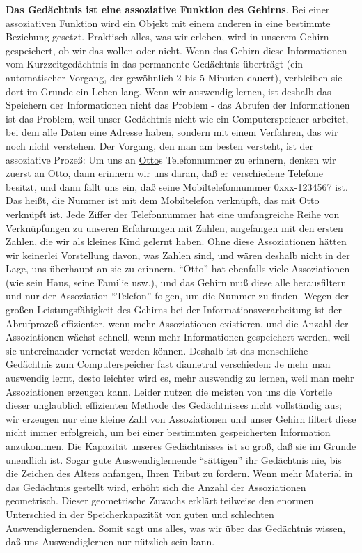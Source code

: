 \textbf{Das Gedächtnis ist eine assoziative Funktion des Gehirns}.
Bei einer assoziativen Funktion wird ein Objekt mit einem anderen in eine bestimmte Beziehung gesetzt.
Praktisch alles, was wir erleben, wird in unserem Gehirn gespeichert, ob wir das wollen oder nicht.
Wenn das Gehirn diese Informationen vom Kurzzeitgedächtnis in das permanente Gedächtnis überträgt (ein automatischer Vorgang, der gewöhnlich 2 bis 5 Minuten dauert), verbleiben sie dort im Grunde ein Leben lang.
Wenn wir auswendig lernen, ist deshalb das Speichern der Informationen nicht das Problem - das Abrufen der Informationen ist das Problem, weil unser Gedächtnis nicht wie ein Computerspeicher arbeitet, bei dem alle Daten eine Adresse haben, sondern mit einem Verfahren, das wir noch nicht verstehen.
Der Vorgang, den man am besten versteht, ist der assoziative Prozeß: Um uns an \hyperref[johndoe]{Otto}s Telefonnummer zu erinnern, denken wir zuerst an Otto, dann erinnern wir uns daran, daß er verschiedene Telefone besitzt, und dann fällt uns ein, daß seine Mobiltelefonnummer 0xxx-1234567 ist.
Das heißt, die Nummer ist mit dem Mobiltelefon verknüpft, das mit Otto verknüpft ist.
Jede Ziffer der Telefonnummer hat eine umfangreiche Reihe von Verknüpfungen zu unseren Erfahrungen mit Zahlen, angefangen mit den ersten Zahlen, die wir als kleines Kind gelernt haben.
Ohne diese Assoziationen hätten wir keinerlei Vorstellung davon, was Zahlen sind, und wären deshalb nicht in der Lage, uns überhaupt an sie zu erinnern.
\enquote{Otto} hat ebenfalls viele Assoziationen (wie sein Haus, seine Familie usw.), und das Gehirn muß diese alle herausfiltern und nur der Assoziation \enquote{Telefon} folgen, um die Nummer zu finden.
Wegen der großen Leistungsfähigkeit des Gehirns bei der Informationsverarbeitung ist der Abrufprozeß effizienter, wenn mehr Assoziationen existieren, und die Anzahl der Assoziationen wächst schnell, wenn mehr Informationen gespeichert werden, weil sie untereinander vernetzt werden können.
Deshalb ist das menschliche Gedächtnis zum Computerspeicher fast diametral verschieden: Je mehr man auswendig lernt, desto leichter wird es, mehr auswendig zu lernen, weil man mehr Assoziationen erzeugen kann.
Leider nutzen die meisten von uns die Vorteile dieser unglaublich effizienten Methode des Gedächtnisses nicht vollständig aus; wir erzeugen nur eine kleine Zahl von Assoziationen und unser Gehirn filtert diese nicht immer erfolgreich, um bei einer bestimmten gespeicherten Information anzukommen.
Die Kapazität unseres Gedächtnisses ist so groß, daß sie im Grunde unendlich ist.
Sogar gute Auswendiglernende \enquote{sättigen} ihr Gedächtnis nie, bis die Zeichen des Alters anfangen, Ihren Tribut zu fordern.
Wenn mehr Material in das Gedächtnis gestellt wird, erhöht sich die Anzahl der Assoziationen geometrisch.
Dieser geometrische Zuwachs erklärt teilweise den enormen Unterschied in der Speicherkapazität von guten und schlechten Auswendiglernenden.
Somit sagt uns alles, was wir über das Gedächtnis wissen, daß uns Auswendiglernen nur nützlich sein kann.


